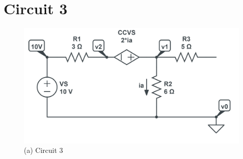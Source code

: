\documentclass[12pt]{article}
\begin{document}
\section{Circuit 3}

\begin{figure}[H]
    \begin{center}
        \includegraphics[scale=0.5]{circuit-3.png}
        \caption { (a) Circuit 3}
    \end{center}
\end{figure}
\end{document}
